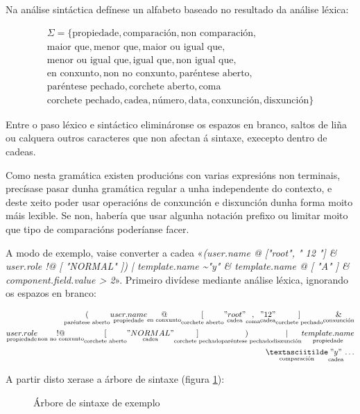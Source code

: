 Na análise sintáctica defínese un alfabeto baseado no resultado da análise léxica:

\begin{equation}
\begin{gathered}
\Sigma = \{ \text{propiedade}, \text{comparación}, \text{non comparación}, \\
	\text{maior que}, \text{menor que}, \text{maior ou igual que}, \\
	\text{menor ou igual que}, \text{igual que}, \text{non igual que}, \\
	\text{en conxunto}, \text{non no conxunto}, \text{paréntese aberto}, \\
	\text{paréntese pechado}, \text{corchete aberto}, \text{coma} \\
	\text{corchete pechado}, \text{cadea}, \text{número}, \text{data}, \text{conxunción}, \text{disxunción} \}
\end{gathered}
\end{equation}

Entre o paso léxico e sintáctico elimináronse os espazos en branco, saltos de liña ou calquera outros caracteres que non afectan á sintaxe, execepto dentro de cadeas.

Como nesta gramática existen producións con varias expresións non terminais, precísase pasar dunha gramática regular a unha independente do contexto, e deste xeito poder usar operacións de conxunción e disxunción dunha forma moito máis lexible. Se non, habería que usar algunha notación prefixo ou limitar moito que tipo de comparacións poderíanse facer.\cite{teoria_automatas}

A modo de exemplo, vaise converter a cadea «\textit{(user.name @ ["root", " 12 "] \& user.role !@ [ "NORMAL" ]) | template.name \textasciitilde "y" \& template.name @ [ "A" ] \& component.field.value > 2}». Primeiro divídese mediante análise léxica, ignorando os espazos en branco:

\begin{eqnarray}
\underset{\text{paréntese aberto}}{(} \underset{\text{propiedade}}{user.name} \underset{\text{en conxunto}}{@} \underset{\text{corchete aberto}}{[} \underset{\text{cadea}}{"root"} \underset{\text{coma}}{,} \underset{\text{cadea}}{" 12 "} \underset{\text{corchete pechado}}{]} \underset{\text{conxunción}}{\&} \\
\underset{\text{propiedade}}{user.role}\underset{\text{non no conxunto}}{!@} \underset{\text{corchete aberto}}{[} \underset{\text{cadea}}{"NORMAL"} \underset{\text{corchete pechado}}{]} \underset{\text{paréntese pechado}}{)} \underset{\text{disxunción}}{|} \underset{\text{propiedade}}{template.name} \\
\underset{\text{comparación}}{\textasciitilde} \underset{\text{cadea}}{"y"} \ldots
\end{eqnarray}

A partir disto xerase a árbore de sintaxe (figura \ref{fig:arboresintaxe}):

\begin{figure}[H]
	\centering
	\resizebox{.8\linewidth}{!}{}
	\caption{Árbore de sintaxe de exemplo}
	\label{fig:arboresintaxe}
\end{figure}